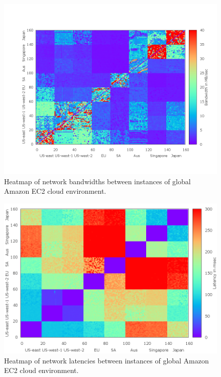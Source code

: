 \documentclass[10pt,journal,cspaper,compsoc]{IEEEtran}
\begin{document}
\begin{figure}[htb]
\begin{center}
\includegraphics[width=\linewidth]{plots/bwheatmap.png}
\caption{Heatmap of network bandwidths between instances of global Amazon EC2 cloud environment.
\label{fig_bw}
}
\end{center}
\end{figure}
%
\begin{figure}[htb]
\begin{center}
\includegraphics[width=\linewidth]{plots/latheatmap.png}
\caption{Heatmap of network latencies between instances of global Amazon EC2 cloud environment.
\label{fig_lat}
}
\end{center}
\end{figure}
\end{document}
